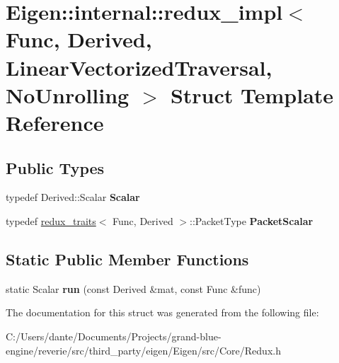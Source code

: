 \hypertarget{struct_eigen_1_1internal_1_1redux__impl_3_01_func_00_01_derived_00_01_linear_vectorized_traversal_00_01_no_unrolling_01_4}{}\section{Eigen\+::internal\+::redux\+\_\+impl$<$ Func, Derived, Linear\+Vectorized\+Traversal, No\+Unrolling $>$ Struct Template Reference}
\label{struct_eigen_1_1internal_1_1redux__impl_3_01_func_00_01_derived_00_01_linear_vectorized_traversal_00_01_no_unrolling_01_4}
\subsection*{Public Types}
\begin{DoxyCompactItemize}
\item 
\mbox{\label{struct_eigen_1_1internal_1_1redux__impl_3_01_func_00_01_derived_00_01_linear_vectorized_traversal_00_01_no_unrolling_01_4_a534ce85756f72b2d52b59a59bbd939a0}} 
typedef Derived\+::\+Scalar {\bfseries Scalar}
\item 
\mbox{\label{struct_eigen_1_1internal_1_1redux__impl_3_01_func_00_01_derived_00_01_linear_vectorized_traversal_00_01_no_unrolling_01_4_a23870bd1c8fb4a12f46f4e32480a2251}} 
typedef \mbox{\hyperlink{struct_eigen_1_1internal_1_1redux__traits}{redux\+\_\+traits}}$<$ Func, Derived $>$\+::Packet\+Type {\bfseries Packet\+Scalar}
\end{DoxyCompactItemize}
\subsection*{Static Public Member Functions}
\begin{DoxyCompactItemize}
\item 
\mbox{\label{struct_eigen_1_1internal_1_1redux__impl_3_01_func_00_01_derived_00_01_linear_vectorized_traversal_00_01_no_unrolling_01_4_aebee3fe3766fc03d8069104053095ca8}} 
static Scalar {\bfseries run} (const Derived \&mat, const Func \&func)
\end{DoxyCompactItemize}


The documentation for this struct was generated from the following file\+:\begin{DoxyCompactItemize}
\item 
C\+:/\+Users/dante/\+Documents/\+Projects/grand-\/blue-\/engine/reverie/src/third\+\_\+party/eigen/\+Eigen/src/\+Core/Redux.\+h\end{DoxyCompactItemize}

